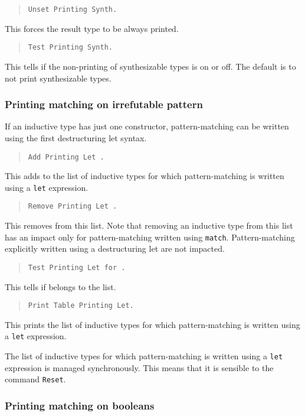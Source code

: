 \begin{quote}
{\tt Unset Printing Synth.}
\end{quote}
This forces the result type to be always printed.

\begin{quote}
{\tt Test Printing Synth.}
\end{quote}
This tells if the non-printing of synthesizable types is on or off.
The default is to not print synthesizable types.

\subsubsection{Printing matching on irrefutable pattern
\label{AddPrintingLet}
}

If an inductive type has just one constructor,
pattern-matching can be written using the first destructuring let syntax.

\begin{quote}
{\tt Add Printing Let {\ident}.}
\end{quote}
This adds {\ident} to the list of inductive types for which
pattern-matching is written using a {\tt let} expression.

\begin{quote}
{\tt Remove Printing Let {\ident}.}
\end{quote}
This removes {\ident} from this list. Note that removing an inductive
type from this list has an impact only for pattern-matching written using
\texttt{match}. Pattern-matching explicitly written using a destructuring
let are not impacted.

\begin{quote}
{\tt Test Printing Let for {\ident}.}
\end{quote}
This tells if {\ident} belongs to the list.

\begin{quote}
{\tt Print Table Printing Let.}
\end{quote}
This prints the list of inductive types for which pattern-matching is
written using a {\tt let} expression.

The list of inductive types for which pattern-matching is written
using a {\tt let} expression is managed synchronously. This means that
it is sensible to the command {\tt Reset}.

\subsubsection{Printing matching on booleans
}


